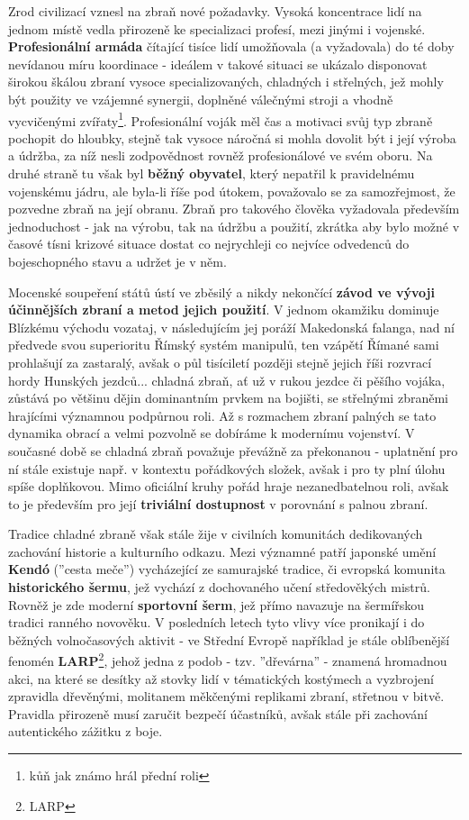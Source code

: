 Zrod civilizací vznesl na zbraň nové požadavky. Vysoká koncentrace lidí na jednom místě vedla přirozeně ke specializaci profesí, mezi jinými i vojenské. \textbf{Profesionální armáda} čítající tisíce lidí umožňovala (a vyžadovala) do té doby nevídanou míru koordinace - ideálem v takové situaci se ukázalo disponovat širokou škálou zbraní vysoce specializovaných, chladných i střelných, jež mohly být použity ve vzájemné synergii, doplněné válečnými stroji a vhodně vycvičenými zvířaty\footnote{kůň jak známo hrál přední roli}. Profesionální voják měl čas a motivaci svůj typ zbraně pochopit do hloubky, stejně tak vysoce náročná si mohla dovolit být i její výroba a údržba, za níž nesli zodpovědnost rovněž profesionálové ve svém oboru. 
Na druhé straně tu však byl \textbf{běžný obyvatel}, který nepatřil k pravidelnému vojenskému jádru, ale byla-li říše pod útokem, považovalo se za samozřejmost, že pozvedne zbraň na její obranu. Zbraň pro takového člověka vyžadovala především jednoduchost - jak na výrobu, tak na údržbu a použití, zkrátka aby bylo možné v časové tísni krizové situace dostat co nejrychleji co nejvíce odvedenců do bojeschopného stavu a udržet je v něm.

Mocenské soupeření států ústí ve zběsilý a nikdy nekončící \textbf{závod ve vývoji účinnějších zbraní a metod jejich použití}. V jednom okamžiku dominuje Blízkému východu vozataj, v následujícím jej poráží Makedonská falanga, nad ní předvede svou superioritu Římský systém manipulů, ten vzápětí Římané sami prohlašují za zastaralý, avšak o půl tisíciletí později stejně jejich říši rozvrací hordy Hunských jezdců... chladná zbraň, ať už v rukou jezdce či pěšího vojáka, zůstává po většinu dějin dominantním prvkem na bojišti, se střelnými zbraněmi hrajícími významnou podpůrnou roli. Až s rozmachem zbraní palných se tato dynamika obrací a velmi pozvolně se dobíráme k modernímu vojenství. V současné době se chladná zbraň považuje převážně za překonanou - uplatnění pro ní stále existuje např. v kontextu pořádkových složek, avšak i pro ty plní úlohu spíše doplňkovou. Mimo oficiální kruhy pořád hraje nezanedbatelnou roli, avšak to je především pro její \textbf{triviální dostupnost} v porovnání s palnou zbraní.

Tradice chladné zbraně však stále žije v civilních komunitách dedikovaných zachování historie a kulturního odkazu. Mezi významné patří japonské umění \textbf{Kendó} (''cesta meče'') vycházející ze samurajské tradice, či evropská komunita \textbf{historického šermu}, jež vychází z dochovaného učení středověkých mistrů. Rovněž je zde moderní \textbf{sportovní šerm}, jež přímo navazuje na šermířskou tradici ranného novověku. V posledních letech tyto vlivy více pronikají i do běžných volnočasových aktivit - ve Střední Evropě například je stále oblíbenější fenomén \textbf{LARP}\footnote{\ac{LARP}}, jehož jedna z podob - tzv. ''dřevárna'' - znamená hromadnou akci, na které se desítky až stovky lidí v tématických kostýmech a vyzbrojení zpravidla dřevěnými, molitanem měkčenými replikami zbraní, střetnou v bitvě. Pravidla přirozeně musí zaručit bezpečí účastníků, avšak stále při zachování autentického zážitku z boje.  

